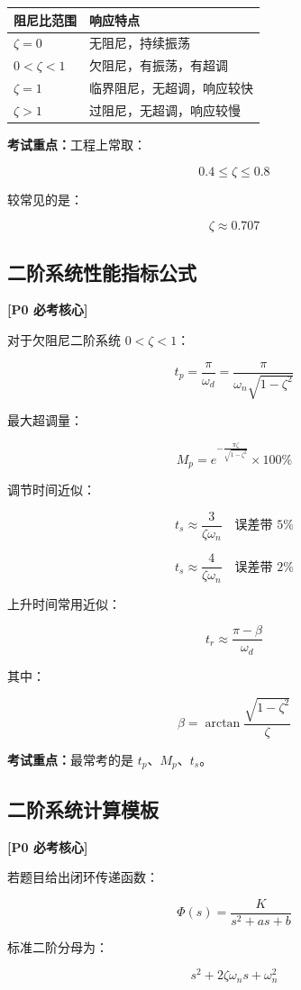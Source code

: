 \documentclass[UTF8,a4paper,12pt]{ctexart}
\newcommand{\Pzero}{\textcolor{p0}{\textbf{[P0 必考核心]}}}
\newcommand{\exam}{\textcolor{p0}{\textbf{考试重点：}}}
\begin{document}
\begin{longtable}{p{4cm}p{10cm}}
\toprule
阻尼比范围 & 响应特点 \\
\midrule
$\zeta=0$ & 无阻尼，持续振荡 \\
$0<\zeta<1$ & 欠阻尼，有振荡，有超调 \\
$\zeta=1$ & 临界阻尼，无超调，响应较快 \\
$\zeta>1$ & 过阻尼，无超调，响应较慢 \\
\bottomrule
\end{longtable}

\exam 工程上常取：

\[
0.4 \leq \zeta \leq 0.8
\]

较常见的是：

\[
\zeta \approx 0.707
\]

\subsection{二阶系统性能指标公式}

\Pzero

对于欠阻尼二阶系统 $0<\zeta<1$：

\[
t_p=\frac{\pi}{\omega_d}
=
\frac{\pi}{\omega_n\sqrt{1-\zeta^2}}
\]

最大超调量：

\[
M_p=e^{-\frac{\pi\zeta}{\sqrt{1-\zeta^2}}}\times 100\%
\]

调节时间近似：

\[
t_s \approx \frac{3}{\zeta\omega_n}
\quad \text{误差带 }5\%
\]

\[
t_s \approx \frac{4}{\zeta\omega_n}
\quad \text{误差带 }2\%
\]

上升时间常用近似：

\[
t_r \approx \frac{\pi-\beta}{\omega_d}
\]

其中：

\[
\beta=\arctan\frac{\sqrt{1-\zeta^2}}{\zeta}
\]

\exam 最常考的是 $t_p$、$M_p$、$t_s$。

\subsection{二阶系统计算模板}

\Pzero

若题目给出闭环传递函数：

\[
\Phi(s)=\frac{K}{s^2+as+b}
\]

标准二阶分母为：

\[
s^2+2\zeta\omega_ns+\omega_n^2
\]
\end{document}
